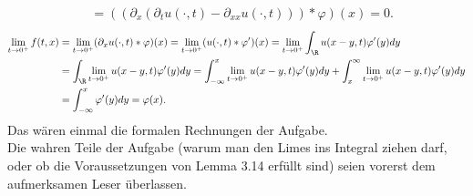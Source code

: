 \begin{solution}
\begin{enumerate}[label = (\roman*)]
\begin{align*}
    &= ((\partial_{x} (\partial_t u(\cdot,t) - \partial_{xx} u(\cdot,t))) \ast \varphi)(x) = 0.
  \end{align*}
  \begin{align*}
    \lim_{t \to 0^+} f(t,x) &= \lim_{t \to 0^+} (\partial_x u(\cdot,t)\ast \varphi)(x)
    = \lim_{t \to 0^+} (u(\cdot,t)\ast \varphi^{\prime})(x)
    = \lim_{t \to 0^+} \int_{\R}u(x-y,t) \varphi^{\prime}(y) dy \\
    &= \int_{\R}\lim_{t \to 0^+} u(x-y,t) \varphi^{\prime}(y) dy
    = \int_{-\infty}^x \lim_{t \to 0^+} u(x-y,t) \varphi^{\prime}(y) dy
    + \int_{x}^{\infty} \lim_{t \to 0^+} u(x-y,t) \varphi^{\prime}(y) dy \\
    &= \int_{-\infty}^x \varphi^{\prime}(y) dy = \varphi(x).
  \end{align*}
  Das wären einmal die formalen Rechnungen der Aufgabe. \\
  Die wahren Teile der Aufgabe (warum man den Limes ins Integral ziehen darf, oder ob
  die Voraussetzungen von Lemma 3.14 erfüllt sind) seien vorerst dem aufmerksamen Leser überlassen.
\end{enumerate}

\end{solution}

